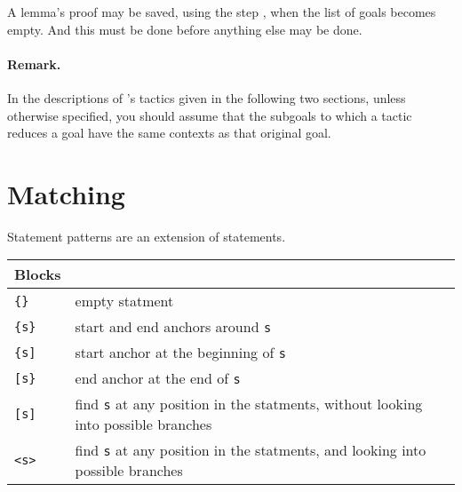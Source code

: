 A lemma's proof may be saved, using the step , when the list
of goals becomes empty. And this must be done before anything else may
be done.

\paragraph{Remark.}
In the descriptions of \EasyCrypt's tactics given in the following two
sections, unless otherwise specified, you should assume that the
subgoals to which a tactic reduces a goal have the same contexts as
that original goal.

\section{Matching}

Statement patterns are an extension of statements.  

\begin{tabular}{| l | l |}
  \hline
  Blocks & \\
  \hline
  \texttt{\{\}} & empty statment \\
  \texttt{\{s\}} & start and end anchors around \texttt{s} \\
  \texttt{\{s]} & start anchor at the beginning of \texttt{s} \\
  \texttt{[s\}} & end anchor at the end of \texttt{s} \\
  \texttt{[s]} & find \texttt{s} at any position in the statments, 
                 without looking into possible branches \\
  \texttt{<s>} & find \texttt{s} at any position in the statments, 
                 and looking into possible branches \\
  \hline
\end{tabular}

